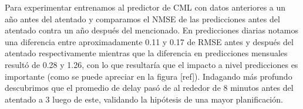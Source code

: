 Para experimentar entrenamos al predictor de CML con datos anteriores a un año antes del atentado y comparamos el NMSE de las predicciones antes del atentado contra un año después del mencionado. En predicciones diarias notamos una diferencia entre aproximadamente 0.11 y 0.17 de RMSE antes y después del atentado respectivamente mientras que la diferencia en predicciones mensuales resultó de 0.28 y 1.26, con lo que resultaría que el impacto a nivel predicciones es importante (como se puede apreciar en la figura [ref]). Indagando más profundo descubrimos que el promedio de delay pasó de al rededor de 8 minutos antes del atentado a 3 luego de este, validando la hipótesis de una mayor planificación.
